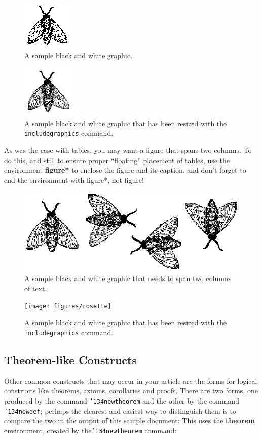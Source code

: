 \documentclass{sig-alternate-05-2015}
\begin{document}
\begin{figure}
	\centering
	\includegraphics{figures/fly}
	\caption{A sample black and white graphic.}
\end{figure}

\begin{figure}
	\centering
	\includegraphics[height=1in, width=1in]{figures/fly}
	\caption{A sample black and white graphic
	that has been resized with the \texttt{includegraphics} command.}
\end{figure}

As was the case with tables, you may want a figure that spans two columns.  To do this, and still to ensure proper ``floating'' placement of tables, use the environment \textbf{figure*} to enclose the figure and its caption. and don't forget to end the environment with {figure*}, not {figure}! 

\begin{figure}
	\centering
	\includegraphics{figures/flies}
	\caption{A sample black and white graphic
	that needs to span two columns of text.}
\end{figure}

\begin{figure}
	\centering
	\texttt{[image: figures/rosette]}
	\caption{A sample black and white graphic that has
	been resized with the \texttt{includegraphics} command.}
	\vskip -6pt
\end{figure}

\subsection{Theorem-like Constructs}
Other common constructs that may occur in your article are the forms for logical constructs like theorems, axioms, corollaries and proofs.  There are two forms, one produced by the command \texttt{{\char'134}newtheorem} and the other by the command \texttt{{\char'134}newdef}; perhaps the clearest and easiest way to distinguish them is to compare the two in the output of this sample document: This uses the \textbf{theorem} environment, created by the\linebreak\texttt{{\char'134}newtheorem} command:
\end{document}
